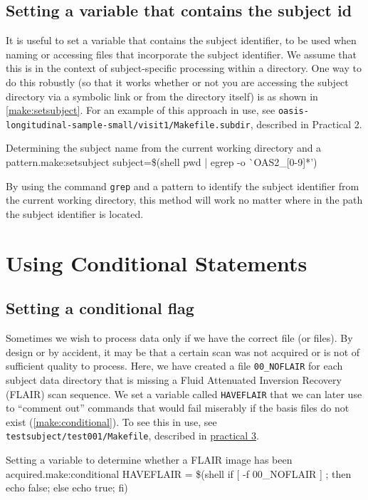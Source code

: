 \subsection{Setting a variable that contains the subject id }
It is useful to set a variable that contains the subject identifier, to be used when naming or accessing files that incorporate the subject identifier. We assume that this is in the context of subject-specific processing within a directory. One way to do this robustly (so that it works whether or not you are accessing the subject directory via a symbolic link or from the directory itself) is as shown in \autoref{make:setsubject}. For an example of this approach in use, see \texttt{oasis-longitudinal-sample-small/visit1/Makefile.subdir}, described in Practical 2.

\begin{make}{Determining the subject name from the current working directory and a pattern.}{make:setsubject}
subject=\$(shell pwd | egrep -o \`{}OAS2_[0-9]*')
\end{make}

By using the command \texttt{grep} and a pattern to identify the subject identifier from the current working directory, this method will work no matter where in the path the subject identifier is located.

\section{Using Conditional Statements}

\subsection{Setting a conditional flag}

Sometimes we wish to process data only if we have the correct file (or files). By design or by accident, it may be that a certain scan was not acquired or is not of sufficient quality to process. Here, we have created a file \texttt{00_NOFLAIR} for each subject data directory that is missing a Fluid Attenuated Inversion Recovery (FLAIR) scan sequence. We set a variable called \texttt{HAVEFLAIR} that we can later use to ``comment out'' commands that would fail miserably if the basis files do not exist (\autoref{make:conditional}). To see this in use, see \texttt{testsubject/test001/Makefile}, described in \hyperref[practicum3]{practical 3}.

\begin{make}{Setting a variable to determine whether a FLAIR image has been acquired.}{make:conditional}
HAVEFLAIR = \$(shell if [ -f 00_NOFLAIR ] ; then echo false; else echo true; fi)
\end{make}

